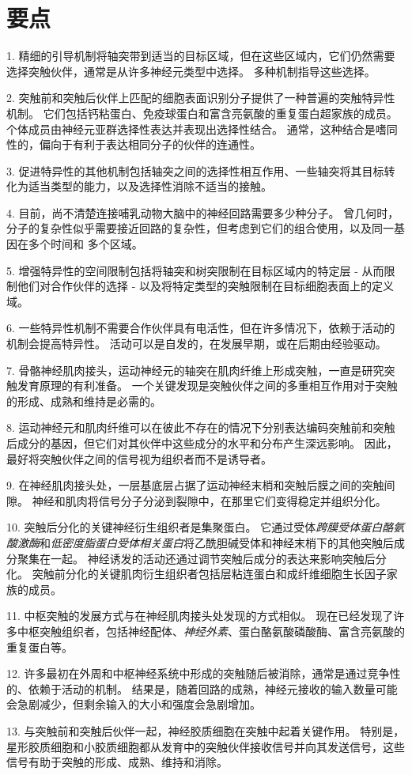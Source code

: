 \section{要点}

1. 精细的引导机制将轴突带到适当的目标区域，但在这些区域内，它们仍然需要选择突触伙伴，通常是从许多神经元类型中选择。
多种机制指导这些选择。


2. 突触前和突触后伙伴上匹配的细胞表面识别分子提供了一种普遍的突触特异性机制。
它们包括钙粘蛋白、免疫球蛋白和富含亮氨酸的重复蛋白超家族的成员。
个体成员由神经元亚群选择性表达并表现出选择性结合。
通常，这种结合是嗜同性的，偏向于有利于表达相同分子的伙伴的连通性。


3. 促进特异性的其他机制包括轴突之间的选择性相互作用、一些轴突将其目标转化为适当类型的能力，以及选择性消除不适当的接触。


4. 目前，尚不清楚连接哺乳动物大脑中的神经回路需要多少种分子。
曾几何时，分子的复杂性似乎需要接近回路的复杂性，但考虑到它们的组合使用，以及同一基因在多个时间和 多个区域。


5. 增强特异性的空间限制包括将轴突和树突限制在目标区域内的特定层 - 从而限制他们对合作伙伴的选择 - 以及将特定类型的突触限制在目标细胞表面上的定义域。 


6. 一些特异性机制不需要合作伙伴具有电活性，但在许多情况下，依赖于活动的机制会提高特异性。
活动可以是自发的，在发展早期，或在后期由经验驱动。 


7. 骨骼神经肌肉接头，运动神经元的轴突在肌肉纤维上形成突触，一直是研究突触发育原理的有利准备。
一个关键发现是突触伙伴之间的多重相互作用对于突触的形成、成熟和维持是必需的。


8. 运动神经元和肌肉纤维可以在彼此不存在的情况下分别表达编码突触前和突触后成分的基因，但它们对其伙伴中这些成分的水平和分布产生深远影响。
因此，最好将突触伙伴之间的信号视为组织者而不是诱导者。


9. 在神经肌肉接头处，一层基底层占据了运动神经末梢和突触后膜之间的突触间隙。
神经和肌肉将信号分子分泌到裂隙中，在那里它们变得稳定并组织分化。


10. 突触后分化的关键神经衍生组织者是集聚蛋白。
它通过受体\textit{跨膜受体蛋白酪氨酸激酶}和\textit{低密度脂蛋白受体相关蛋白}将乙酰胆碱受体和神经末梢下的其他突触后成分聚集在一起。
神经诱发的活动还通过调节突触后成分的表达来影响突触后分化。
突触前分化的关键肌肉衍生组织者包括层粘连蛋白和成纤维细胞生长因子家族的成员。


11. 中枢突触的发展方式与在神经肌肉接头处发现的方式相似。
现在已经发现了许多中枢突触组织者，包括神经配体、\textit{神经外素}、蛋白酪氨酸磷酸酶、富含亮氨酸的重复蛋白等。


12. 许多最初在外周和中枢神经系统中形成的突触随后被消除，通常是通过竞争性的、依赖于活动的机制。
结果是，随着回路的成熟，神经元接收的输入数量可能会急剧减少，但剩余输入的大小和强度会急剧增加。


13. 与突触前和突触后伙伴一起，神经胶质细胞在突触中起着关键作用。
特别是，星形胶质细胞和小胶质细胞都从发育中的突触伙伴接收信号并向其发送信号，这些信号有助于突触的形成、成熟、维持和消除。


